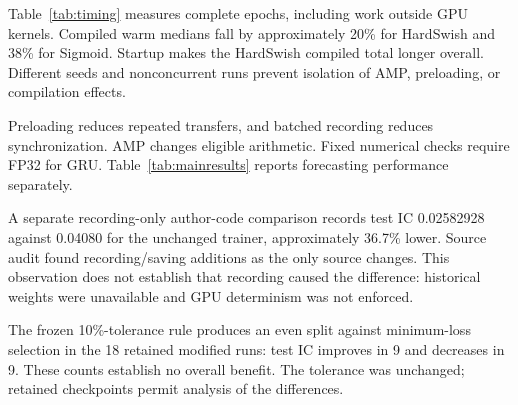 \documentclass[conference]{IEEEtran}
\begin{document}
Table~\ref{tab:timing} measures complete epochs, including work outside GPU kernels. Compiled warm medians fall by approximately 20\% for HardSwish and 38\% for Sigmoid. Startup makes the HardSwish compiled total longer overall. Different seeds and nonconcurrent runs prevent isolation of AMP, preloading, or compilation effects.

Preloading reduces repeated transfers, and batched recording reduces synchronization. AMP changes eligible arithmetic. Fixed numerical checks require FP32 for GRU. Table~\ref{tab:mainresults} reports forecasting performance separately.

A separate recording-only author-code comparison records test IC 0.02582928 against 0.04080 for the unchanged trainer, approximately 36.7\% lower. Source audit found recording/saving additions as the only source changes. This observation does not establish that recording caused the difference: historical weights were unavailable and GPU determinism was not enforced.

The frozen 10\%-tolerance rule produces an even split against minimum-loss selection in the 18 retained modified runs: test IC improves in 9 and decreases in 9. These counts establish no overall benefit. The tolerance was unchanged; retained checkpoints permit analysis of the differences.
\end{document}

